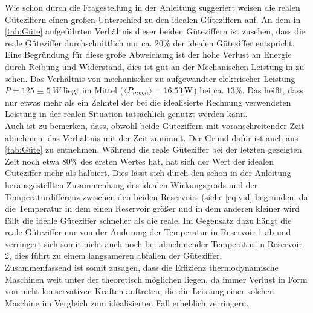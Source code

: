 Wie schon durch die Fragestellung in der Anleitung suggeriert weisen die realen 
Güteziffern einen großen Unterschied zu den idealen Güteziffern auf.
An dem in \autoref{tab:Güte} aufgeführten Verhältnis dieser beiden Güteziffern
ist zusehen, dass die reale Güteziffer durchschnittlich nur ca. $20\%$ der idealen Güteziffer
entspricht.
Eine Begründung für diese große Abweichung ist der hohe Verlust an Energie durch Reibung und Widerstand,
dies ist gut an der Mechanischen Leistung in  zu sehen. Das Verhältnis von mechanischer
zu aufgewandter elektrischer Leistung $P = \SI{125(5)}{W} $ liegt im Mittel ($\langle P_{mech}\rangle = \SI{16,53}{W}$)
bei ca. $13\%$. Das heißt, dass nur etwas mehr als ein Zehntel der bei die idealisierte Rechnung verwendeten Leistung 
in der realen Situation tatsächlich genutzt werden kann.\\

Auch ist zu bemerken, dass, obwohl beide Güteziffern mit voranschreitender Zeit abnehmen, das Verhältnis
mit der Zeit zunimmt. Der Grund dafür ist auch aus \autoref{tab:Güte} zu entnehmen. Während die reale 
Güteziffer bei der letzten gezeigten Zeit noch etwa $80\%$ des ersten Wertes hat, hat sich der Wert der 
idealen Güteziffer mehr als halbiert. Dies lässt sich durch den schon in der Anleitung herausgestellten 
Zusammenhang des idealen Wirkungsgrads und der Temperaturdifferenz zwischen den beiden Reservoirs (siehe \eqref{eq:vid} begründen,
da die Temperatur in  dem einen Reservoir größer und in dem anderen kleiner wird fällt die ideale Güteziffer schneller als die reale.
Im Gegensatz dazu hängt die reale Güteziffer nur von der Änderung der Temperatur in Reservoir 1 
ab und verringert sich somit nicht auch noch bei abnehmender Temperatur in Reservoir 2, dies führt zu einem langsameren abfallen der Güteziffer.\\

Zusammenfassend ist somit zusagen, dass die Effizienz thermodynamische Maschinen weit unter der theoretisch möglichen liegen,
da immer Verlust in Form von nicht konservativen Kräften auftreten, die die Leistung einer solchen Maschine im Vergleich zum idealisierten Fall
erheblich verringern.     
   
 
 